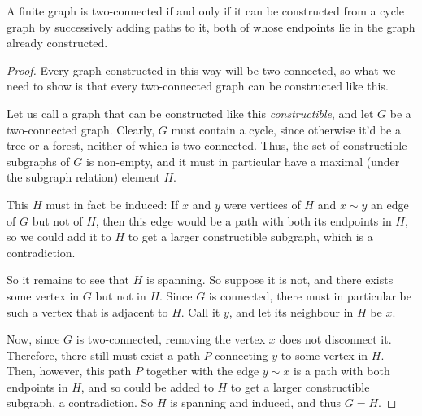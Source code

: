 \documentclass[nobib]{tufte-handout}
\begin{document}
\begin{theorem}\label{lemma:structure_of_twoconnected_graphs}
  A finite graph is two-connected if and only if it can be constructed from a cycle graph by successively adding paths to it, both of whose endpoints lie in the graph already constructed.

  \begin{proof}
    Every graph constructed in this way will be two-connected, so what we need to show is that every two-connected graph can be constructed like this.

    Let us call a graph that can be constructed like this \emph{constructible}, and let $G$ be a two-connected graph. Clearly, $G$ must contain a cycle, since otherwise it'd be a tree or a forest, neither of which is two-connected. Thus, the set of constructible subgraphs of $G$ is non-empty, and it must in particular have a maximal (under the subgraph relation) element $H$.

    This $H$ must in fact be induced: If $x$ and $y$ were vertices of $H$ and $x\sim y$ an edge of $G$ but not of $H$, then this edge would be a path with both its endpoints in $H$, so we could add it to $H$ to get a larger constructible subgraph, which is a contradiction.

    So it remains to see that $H$ is spanning. So suppose it is not, and there exists some vertex in $G$ but not in $H$. Since $G$ is connected, there must in particular be such a vertex that is adjacent to $H$. Call it $y$, and let its neighbour in $H$ be $x$.
    
    Now, since $G$ is two-connected, removing the vertex $x$ does not disconnect it. Therefore, there still must exist a path $P$ connecting $y$ to some vertex in $H$. Then, however, this path $P$ together with the edge $y \sim x$ is a path with both endpoints in $H$, and so could be added to $H$ to get a larger constructible subgraph, a contradiction. So $H$ is spanning and induced, and thus $G = H$.
  \end{proof}
\end{theorem}
\end{document}
